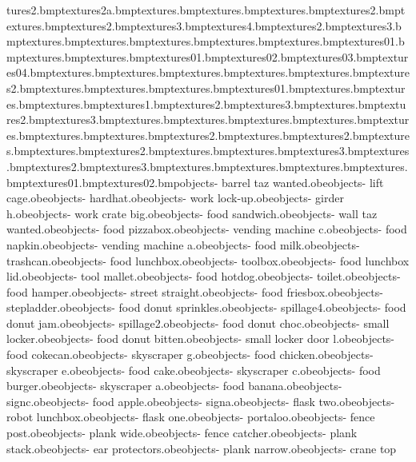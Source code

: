 tures\gurderend2.bmp textures\gurderend2a.bmp textures\gurderenda.bmp textures\gurderendgrey.bmp textures\gurdergrey.bmp textures\gurdergrey2.bmp textures\hamper.bmp textures\hamper2.bmp textures\hamper3.bmp textures\hamper4.bmp textures\hampfod2.bmp textures\hampfod3.bmp textures\hampfood.bmp textures\hamplid.bmp textures\helipad.bmp textures\hinge.bmp textures\hotdog.bmp textures\hrydrant01.bmp textures\hutposts.bmp textures\ironrods.bmp textures\lift01.bmp textures\lift02.bmp textures\lift03.bmp textures\lift04.bmp textures\liftbumper.bmp textures\liftdoorleft.bmp textures\liftdoorright.bmp textures\liftfront.bmp textures\liftmag.bmp textures\liftmag2.bmp textures\liftpwerdisc.bmp textures\liftshaft.bmp textures\lifttop.bmp textures\lighthalo01.bmp textures\lightstrip.bmp textures\lobbycarpetcol.bmp textures\lock.bmp textures\locker1.bmp textures\locker2.bmp textures\locker3.bmp textures\lockup.bmp textures\lockup2.bmp textures\lockup3.bmp textures\lorryarch.bmp textures\lorryback.bmp textures\lorrybonnet.bmp textures\lorrydash.bmp textures\lorrydoor.bmp textures\lorrydoorinside.bmp textures\lorryexhaust.bmp textures\lorryexhaust2.bmp textures\lorryfront.bmp textures\lorryfront2.bmp textures\lorryfueltank.bmp textures\lorryinter.bmp textures\lorryinter2.bmp textures\lorrymetal.bmp textures\lorrymixer.bmp textures\lorrymixer3.bmp textures\lorrypanels.bmp textures\lorrypanels2.bmp textures\lorrypanels3.bmp textures\lorryroof.bmp textures\lorryrope.bmp textures\lorryunder.bmp textures\lorrywindow.bmp textures\machineback01.bmp textures\machineback02.bmp objects\bank - barrel taz wanted.obe objects\bank - lift cage.obe objects\bank - hardhat.obe objects\bank - work lock-up.obe objects\bank - girder h.obe objects\bank - work crate big.obe objects\bank - food sandwich.obe objects\bank - wall taz wanted.obe objects\bank - food pizzabox.obe objects\bank - vending machine c.obe objects\bank - food napkin.obe objects\bank - vending machine a.obe objects\bank - food milk.obe objects\bank - trashcan.obe objects\bank - food lunchbox.obe objects\bank - toolbox.obe objects\bank - food lunchbox lid.obe objects\bank - tool mallet.obe objects\bank - food hotdog.obe objects\bank - toilet.obe objects\bank - food hamper.obe objects\bank - street straight.obe objects\bank - food friesbox.obe objects\bank - stepladder.obe objects\bank - food donut sprinkles.obe objects\bank - spillage4.obe objects\bank - food donut jam.obe objects\bank - spillage2.obe objects\bank - food donut choc.obe objects\bank - small locker.obe objects\bank - food donut bitten.obe objects\bank - small locker door l.obe objects\bank - food cokecan.obe objects\bank - skyscraper g.obe objects\bank - food chicken.obe objects\bank - skyscraper e.obe objects\bank - food cake.obe objects\bank - skyscraper c.obe objects\bank - food burger.obe objects\bank - skyscraper a.obe objects\bank - food banana.obe objects\bank - signc.obe objects\bank - food apple.obe objects\bank - signa.obe objects\bank - flask two.obe objects\bank - robot lunchbox.obe objects\bank - flask one.obe objects\bank - portaloo.obe objects\bank - fence post.obe objects\bank - plank wide.obe objects\bank - fence catcher.obe objects\bank - plank stack.obe objects\bank - ear protectors.obe objects\bank - plank narrow.obe objects\bank - crane top 